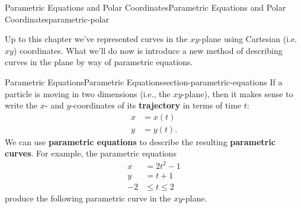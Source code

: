 \documentclass[oneside,10pt,]{book}
\newcommand{\terminology}[1]{\textbf{#1}}
\numberwithin{equation}{section}
\newcommand{\amp}{&}
\begin{document}
\begin{chapterptx}{Parametric Equations and Polar Coordinates}{}{Parametric Equations and Polar Coordinates}{}{}{parametric-polar}
\begin{introduction}{}%
\hypertarget{p-987}{}%
Up to this chapter we've represented curves in the \(xy\)-plane using Cartesian (i.e. \(xy\)) coordinates. What we'll do now is introduce a new method of describing curves in the plane by way of parametric equations.%
\end{introduction}%
%
%
\typeout{************************************************}
\typeout{************************************************}
%
\begin{sectionptx}{Parametric Equations}{}{Parametric Equations}{}{}{section-parametric-equations}
\hypertarget{p-988}{}%
If a particle is moving in two dimensions (i.e., the \(xy\)-plane), then it makes sense to write the \(x\)- and \(y\)-coordinates of its \terminology{trajectory} in terms of time \(t\):%
\begin{align*}
x \amp = x(t) \\
y \amp = y(t) \text{.}
\end{align*}
We can use \terminology{parametric equations} to describe the resulting \terminology{parametric curves}. For example, the parametric equations%
%
\begin{align*}
x \amp = 2t^{2}-1 \\
y \amp = t+1 \\
-2 \amp \leq t\leq 2 
\end{align*}
\hypertarget{p-989}{}%
produce the following parametric curve in the \(xy\)-plane.%
\begin{figure}
\centering
{
}
\end{figure}
\end{sectionptx}
\end{chapterptx}
\end{document}
